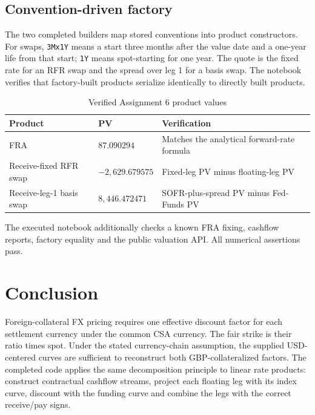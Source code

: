 \documentclass[11pt]{article}
\numberwithin{equation}{section}
\begin{document}
\subsection{Convention-driven factory}
The two completed builders map stored conventions into product constructors.
For swaps, \texttt{3Mx1Y} means a start three months after the value date and
a one-year life from that start; \texttt{1Y} means spot-starting for one year.
The quote is the fixed rate for an RFR swap and the spread over leg 1 for a
basis swap. The notebook verifies that factory-built products serialize
identically to directly built products.

\begin{table}[H]
\centering
\caption{Verified Assignment 6 product values}
\small
\begin{tabularx}{\textwidth}{@{}L{4.1cm}L{3cm}Y@{}}
\toprule{}
\textbf{Product}&\textbf{PV}&\textbf{Verification}\\\midrule
FRA & $87.090294$ & Matches the analytical forward-rate formula\\
Receive-fixed RFR swap & $-2{,}629.679575$ & Fixed-leg PV minus floating-leg PV\\
Receive-leg-1 basis swap & $8{,}446.472471$ & SOFR-plus-spread PV minus Fed-Funds PV\\
\bottomrule
\end{tabularx}
\end{table}

The executed notebook additionally checks a known FRA fixing, cashflow reports,
factory equality and the public valuation API. All numerical assertions pass.

\section{Conclusion}
Foreign-collateral FX pricing requires one effective discount factor for each
settlement currency under the common CSA currency. The fair strike is their
ratio times spot. Under the stated currency-chain assumption, the supplied
USD-centered curves are sufficient to reconstruct both GBP-collateralized
factors. The completed code applies the same decomposition principle to linear
rate products: construct contractual cashflow streams, project each floating
leg with its index curve, discount with the funding curve and combine the legs
with the correct receive/pay signs.
\end{document}
